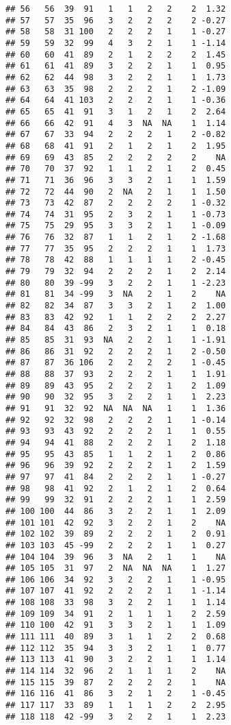\documentclass[]{book}
\theoremstyle{definition}
\theoremstyle{definition}
\theoremstyle{definition}
\theoremstyle{remark}
\begin{document}
\begin{verbatim}
## 56   56  39  91   1   1   2   2    2  1.32
## 57   57  35  96   3   2   2   2    2 -0.27
## 58   58  31 100   2   2   2   1    1 -0.27
## 59   59  32  99   4   3   2   1    1 -1.14
## 60   60  41  89   2   1   2   2    2  1.45
## 61   61  41  89   3   2   2   1    1  0.95
## 62   62  44  98   3   2   2   1    1  1.73
## 63   63  35  98   2   2   2   1    2 -1.09
## 64   64  41 103   2   2   2   1    1 -0.36
## 65   65  41  91   3   1   2   1    2  2.64
## 66   66  42  91   4   3  NA  NA    1  1.14
## 67   67  33  94   2   2   2   1    2 -0.82
## 68   68  41  91   2   1   2   1    2  1.95
## 69   69  43  85   2   2   2   2    2    NA
## 70   70  37  92   1   1   2   1    2  0.45
## 71   71  36  96   3   3   2   1    1  1.59
## 72   72  44  90   2  NA   2   1    1  1.50
## 73   73  42  87   2   2   2   2    1 -0.32
## 74   74  31  95   2   3   2   1    1 -0.73
## 75   75  29  95   3   3   2   1    1 -0.09
## 76   76  32  87   1   1   2   1    2 -1.68
## 77   77  35  95   2   2   2   1    1  1.73
## 78   78  42  88   1   1   1   1    2 -0.45
## 79   79  32  94   2   2   2   1    2  2.14
## 80   80  39 -99   3   2   2   1    1 -2.23
## 81   81  34 -99   3  NA   2   1    2    NA
## 82   82  34  87   3   3   2   1    2  1.00
## 83   83  42  92   1   1   2   2    2  2.27
## 84   84  43  86   2   3   2   1    1  0.18
## 85   85  31  93  NA   2   2   1    1 -1.91
## 86   86  31  92   2   2   2   1    2 -0.50
## 87   87  36 106   2   2   2   2    1 -0.45
## 88   88  37  93   2   2   2   1    1  1.91
## 89   89  43  95   2   2   2   1    2  1.09
## 90   90  32  95   3   2   2   1    1  2.23
## 91   91  32  92  NA  NA  NA   1    1  1.36
## 92   92  32  98   2   2   2   1    1 -0.14
## 93   93  43  92   2   2   2   1    1  0.55
## 94   94  41  88   2   2   2   1    2  1.18
## 95   95  43  85   1   1   2   1    2  0.86
## 96   96  39  92   2   2   2   1    2  1.59
## 97   97  41  84   2   2   2   1    1 -0.27
## 98   98  41  92   2   1   2   1    2  0.64
## 99   99  32  91   2   2   2   1    1  2.59
## 100 100  44  86   3   2   2   1    1  2.09
## 101 101  42  92   3   2   2   1    2    NA
## 102 102  39  89   2   2   2   1    2  0.91
## 103 103  45 -99   2   2   2   1    1  0.27
## 104 104  39  96   3  NA   2   1    1    NA
## 105 105  31  97   2  NA  NA  NA    1  1.27
## 106 106  34  92   3   2   2   1    1 -0.95
## 107 107  41  92   2   2   2   1    1 -1.14
## 108 108  33  98   3   2   2   1    1  1.14
## 109 109  34  91   2   1   1   1    2  2.59
## 110 100  42  91   3   3   2   1    1  1.09
## 111 111  40  89   3   1   1   2    2  0.68
## 112 112  35  94   3   3   2   1    1  0.77
## 113 113  41  90   3   2   2   1    1  1.14
## 114 114  32  96   2   1   1   1    2    NA
## 115 115  39  87   2   2   2   2    1    NA
## 116 116  41  86   3   2   1   2    1 -0.45
## 117 117  33  89   1   1   1   2    2  2.95
## 118 118  42 -99   3   2   2   1    1  2.23
\end{verbatim}
\end{document}
